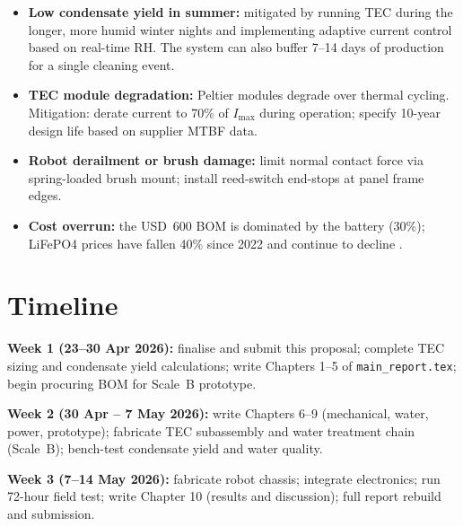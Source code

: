 \documentclass[11pt,a4paper]{article}
\begin{document}
\begin{itemize}[leftmargin=*]
  \item \textbf{Low condensate yield in summer:} mitigated by running TEC during the
  longer, more humid winter nights and implementing adaptive current control based on real-time
  RH. The system can also buffer 7--14 days of production for a single cleaning event.
  \item \textbf{TEC module degradation:} Peltier modules degrade over thermal cycling. Mitigation:
  derate current to 70\% of $I_{\max}$ during operation; specify 10-year design life based on
  supplier MTBF data.
  \item \textbf{Robot derailment or brush damage:} limit normal contact force via spring-loaded
  brush mount; install reed-switch end-stops at panel frame edges.
  \item \textbf{Cost overrun:} the USD~600 BOM is dominated by the battery (30\%); LiFePO4
  prices have fallen 40\% since 2022 and continue to decline \cite{irena2023egypt}.
\end{itemize}

\section{Timeline}

\textbf{Week 1 (23--30 Apr 2026):} finalise and submit this proposal; complete TEC sizing and
condensate yield calculations; write Chapters 1--5 of \texttt{main\_report.tex}; begin procuring
BOM for Scale~B prototype.

\textbf{Week 2 (30 Apr -- 7 May 2026):} write Chapters 6--9 (mechanical, water, power, prototype);
fabricate TEC subassembly and water treatment chain (Scale~B); bench-test condensate yield and
water quality.

\textbf{Week 3 (7--14 May 2026):} fabricate robot chassis; integrate electronics; run 72-hour
field test; write Chapter 10 (results and discussion); full report rebuild and submission.



\end{document}
